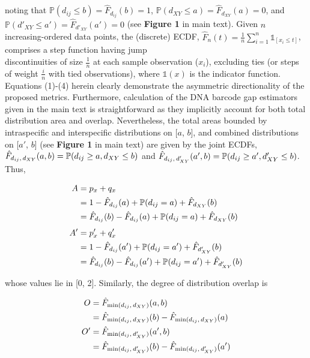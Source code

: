 \documentclass[12pt]{article}
\begin{document}
\noindent noting that $\mathbb{P}(d_{ij} \leq b) = \hat{F}_{d_{ij}}(b) = 1$, $\mathbb{P}(d_{XY} \leq a) = \hat{F}_{d_{XY}}(a) = 0$, and \\ $\mathbb{P}(d'_{XY} \leq a') = \hat{F}_{d'_{XY}}(a') = 0$ (see \textbf{Figure 1} in main text). Given $n$ increasing-ordered data points, the (discrete) ECDF, $\hat{F}_n(t) = \frac{1}{n}\sum_{i = 1}^n\mathds{1}_{[x_i \leq t]}$, comprises a step function having jump \\ discontinuities of size $\frac{1}{n}$ at each sample observation ($x_i$), excluding ties (or steps of weight $\frac{i}{n}$ with tied observations), where $\mathds{1}(x)$ is the indicator function. Equations (1)-(4) herein clearly demonstrate the asymmetric directionality of the proposed metrics. Furthermore, calculation of the DNA barcode gap estimators given in the main text is straightforward as they implicitly account for both total distribution area and overlap. Nevertheless, the total areas bounded by intraspecific and interspecific distributions on [$a$, $b$], and combined distributions on [$a'$, $b$] (see \textbf{Figure 1} in main text) are given by the joint ECDFs, \\ $\hat{F}_{d_{ij}, \hspace{0.5mm} d_{XY}}(a, b) = \mathbb{P}(d_{ij} \geq a, d_{XY} \leq b)$ and $\hat{F}_{d_{ij}, \hspace{0.5mm} d'_{XY}}(a', b) = \mathbb{P}(d_{ij} \geq a', d'_{XY} \leq b)$. Thus,

\begin{align}
\notag A &= p_x + q_x \\ 
\notag  &= 1 - \hat{F}_{d_{ij}}(a) + \mathbb{P}(d_{ij} = a) + \hat{F}_{d_{XY}}(b) \\
  &= \hat{F}_{d_{ij}}(b) - \hat{F}_{d_{ij}}(a) + \mathbb{P}(d_{ij} = a) + \hat{F}_{d_{XY}}(b) \\[1ex]
\notag A' &= p'_x + q'_x \\
\notag &= 1 - \hat{F}_{d_{ij}}(a') + \mathbb{P}(d_{ij} = a') + \hat{F}_{d'_{XY}}(b) \\
  &= \hat{F}_{d_{ij}}(b) - \hat{F}_{d_{ij}}(a') + \mathbb{P}(d_{ij} = a') + \hat{F}_{d'_{XY}}(b)
\end{align}

\noindent whose values lie in [0, 2]. Similarly, the degree of distribution overlap is

\begin{align}
\notag O &= \hat{F}_{\mathrm{min}(d_{ij}, \hspace{0.5mm} d_{XY})}(a, b) \\
&= \hat{F}_{\mathrm{min}(d_{ij}, \hspace{0.5mm} d_{XY})}(b) - \hat{F}_{\mathrm{min}(d_{ij}, \hspace{0.5mm} d_{XY})}(a)\\
\notag O' &= \hat{F}_{\mathrm{min}(d_{ij}, \hspace{0.5mm} d'_{XY})}(a', b) \\ &= \hat{F}_{\mathrm{min}(d_{ij}, \hspace{0.5mm} d'_{XY})}(b) - \hat{F}_{\mathrm{min}(d_{ij}, \hspace{0.5mm} d'_{XY})}(a') 
\end{align}
\end{document}
